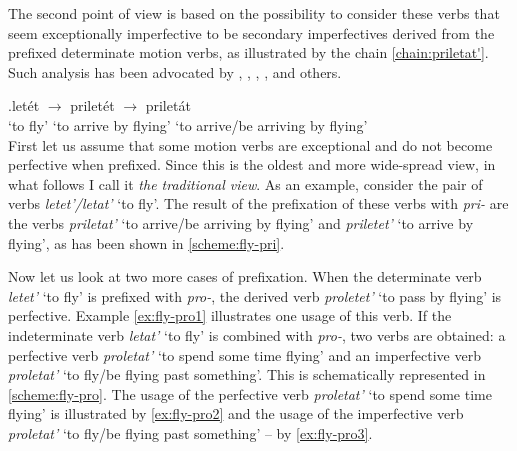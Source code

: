The second point of view is based on the possibility to consider these verbs that seem exceptionally imperfective to be secondary imperfectives derived from the prefixed determinate motion verbs, as illustrated by the chain \ref{chain:priletat'}. Such analysis has been advocated by \citet{Regnell:44}, \citet[337-344]{Isachenko:60}, \citet[87-95]{ZaliznjakShmelev:00}, \citet{Romanova:06}, and others.

\exg.\label{chain:priletat'}{let\'{e}t\textsuperscript{\IPF}} {$\to$} {prilet\'{e}t\textsuperscript{\PF}} {$\to$} prilet\'{a}t\textsuperscript{\IPF}\\
{`to fly'} {} {`to arrive by flying'} {} {`to arrive/be arriving by flying'}\\


First let us assume that some motion verbs are exceptional and do not become perfective when prefixed. Since this is the oldest and more wide-spread view, in what follows I call it \textit{the traditional view}. As an example, consider the pair of verbs \textit{letet'/letat'} `to fly'. The result of the prefixation of these verbs with \textit{pri-} are the verbs \textit{priletat'}\textsuperscript{\IPF} `to arrive/be arriving by flying' and \textit{priletet'\textsuperscript{\PF}} `to arrive by flying', as has been shown in \ref{scheme:fly-pri}. 


Now let us look at two more cases of prefixation. When the determinate verb \textit{letet'}\textsuperscript{\IPF} `to fly' is prefixed with \textit{pro-}, the derived verb \textit{proletet'}\textsuperscript{\PF} `to pass by flying' is perfective. Example \ref{ex:fly-pro1} illustrates one usage of this verb. If the indeterminate verb \textit{letat'}\textsuperscript{\IPF} `to fly' is combined with \textit{pro-}, two verbs are obtained: a perfective verb \textit{proletat'}\textsuperscript{\PF} `to spend some time flying' and an imperfective verb \textit{proletat'}\textsuperscript{\IPF} `to fly/be flying past something'.  This is schematically represented in \ref{scheme:fly-pro}. The usage of the perfective verb \textit{proletat'}\textsuperscript{\PF} `to spend some time flying' is illustrated by \ref{ex:fly-pro2} and the usage of the imperfective verb \textit{proletat'}\textsuperscript{\IPF} `to fly/be flying past something' -- by \ref{ex:fly-pro3}. 

